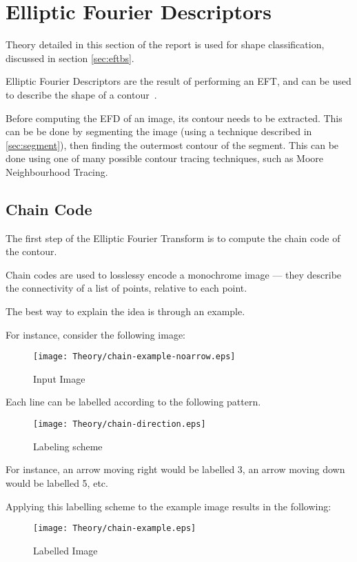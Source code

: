 \section{Elliptic Fourier Descriptors}
\label{sec:eft}
Theory detailed in this section of the report is used for shape classification, discussed in section \ref{sec:eftbs}.

Elliptic Fourier Descriptors are the result of performing an \ac{EFT}, and can be used to describe the shape of a contour~\cite{kuhl1982elliptic}.

Before computing the EFD of an image, its contour needs to be extracted. This can be be done by segmenting the image (using a technique described in \ref{sec:segment}), then finding the outermost contour of the segment. This can be done using one of many possible contour tracing techniques, such as Moore Neighbourhood Tracing.

\subsection{Chain Code}
The first step of the Elliptic Fourier Transform is to compute the chain code of the contour.

Chain codes are used to losslessy encode a monochrome image --- they describe the connectivity of a list of points, relative to each point.

The best way to explain the idea is through an example.

For instance, consider the following image:

\begin{figure}[H]
    \centering
    \texttt{[image: Theory/chain-example-noarrow.eps]}
    \caption{Input Image}
\end{figure}

Each line can be labelled according to the following pattern.

\begin{figure}[H]
    \centering
    \texttt{[image: Theory/chain-direction.eps]}
    \caption{Labeling scheme}
\end{figure}

For instance, an arrow moving right would be labelled $3$, an arrow moving down would be labelled 5, etc. 

Applying this labelling scheme to the example image results in the following:

\begin{figure}[H]
    \centering
    \texttt{[image: Theory/chain-example.eps]}
    \caption{Labelled Image}
\end{figure}


